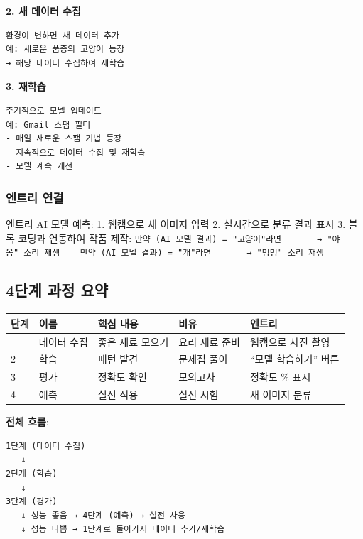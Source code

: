 \documentclass[a4paper, 11pt]{article}
\begin{document}
\textbf{2. 새 데이터 수집}

\begin{verbatim}
환경이 변하면 새 데이터 추가
예: 새로운 품종의 고양이 등장
→ 해당 데이터 수집하여 재학습
\end{verbatim}

\textbf{3. 재학습}

\begin{verbatim}
주기적으로 모델 업데이트
예: Gmail 스팸 필터
- 매일 새로운 스팸 기법 등장
- 지속적으로 데이터 수집 및 재학습
- 모델 계속 개선
\end{verbatim}

\hypertarget{uxc5d4uxd2b8uxb9ac-uxc5f0uxacb0-3}{%
\subsubsection{엔트리 연결}\label{uxc5d4uxd2b8uxb9ac-uxc5f0uxacb0-3}}

엔트리 AI 모델 예측: 1. 웹캠으로 새 이미지 입력 2. 실시간으로 분류 결과
표시 3. 블록 코딩과 연동하여 작품 제작:
\texttt{만약\ (AI\ 모델\ 결과)\ =\ "고양이"라면\ \ \ \ \ \ \ →\ "야옹"\ 소리\ 재생\ \ \ \ 만약\ (AI\ 모델\ 결과)\ =\ "개"라면\ \ \ \ \ \ \ →\ "멍멍"\ 소리\ 재생}

\hypertarget{uxb2e8uxacc4-uxacfcuxc815-uxc694uxc57d}{%
\subsection{4단계 과정
요약}\label{uxb2e8uxacc4-uxacfcuxc815-uxc694uxc57d}}

\begin{longtable}{p{2.0cm}p{2.5cm}p{3.0cm}p{3.0cm}p{3.5cm}}
\toprule\noalign{}
\textbf{단계} & \textbf{이름} & \textbf{핵심 내용} & \textbf{비유} & \textbf{엔트리} \\
\midrule\noalign{}
\endhead
\bottomrule\noalign{}
\endlastfoot
1 & 데이터 수집 & 좋은 재료 모으기 & 요리 재료 준비 & 웹캠으로 사진
촬영 \\
2 & 학습 & 패턴 발견 & 문제집 풀이 & ``모델 학습하기'' 버튼 \\
3 & 평가 & 정확도 확인 & 모의고사 & 정확도 \% 표시 \\
4 & 예측 & 실전 적용 & 실전 시험 & 새 이미지 분류 \\
\end{longtable}

\textbf{전체 흐름}:

\begin{verbatim}
1단계 (데이터 수집)
   ↓
2단계 (학습)
   ↓
3단계 (평가)
   ↓ 성능 좋음 → 4단계 (예측) → 실전 사용
   ↓ 성능 나쁨 → 1단계로 돌아가서 데이터 추가/재학습
\end{verbatim}
\end{document}
